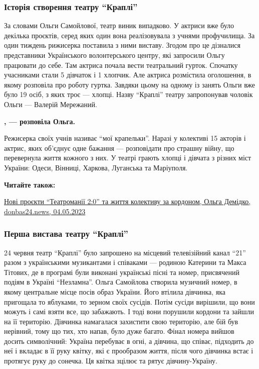 \subsubsection{Історія створення театру \enquote{Краплі}}

За словами Ольги Самойлової, театр виник випадково. У актриси вже було декілька
проєктів, серед яких один вона реалізовувала з учнями профучилища. За один
тиждень рижисерка поставила з ними виставу. Згодом про це дізналися
представники Українського волонтерського центру, які запросили Ольгу працювати
до себе. Там актриса почала вести театральний гурток. Спочатку учасниками стали
5 дівчаток і 1 хлопчик. Але актриса розмістила оголошення, в якому розповіла
про роботу гуртка. Завдяки цьому на одному із занять Ольги вже було 19 осіб, з
яких троє — хлопці. Назву \enquote{Краплі} театру запропонував чоловік Ольги —
Валерій Мережаний.

\begin{leftbar}
	\begingroup
		\bfseries
{}, — розповіла Ольга.
	\endgroup
\end{leftbar}

Режисерка своїх учнів називає \enquote{мої крапельки}. Наразі у колективі 15
акторів і актрис, яких об'єднує одне бажання — розповідати про страшну війну,
що перевернула життя кожного з них. У театрі грають хлопці і дівчата з різних
міст України: Одеси, Вінниці, Харкова, Луганська та Маріуполя. 

\textbf{Читайте також:} 

\href{https://donbas24.news/news/novi-projekti-teatromaniyi-20-ta-zittya-kolektivu-za-kordonom}{%
Нові проєкти \enquote{Театроманії 2:0} та життя колективу за кордоном, %
Ольга Демідко, donbas24.news, 04.05.2023}


\subsubsection{Перша вистава театру \enquote{Краплі}}

24 червня театр \enquote{Краплі} було запрошено на місцевий телевізійний канал \enquote{21}
разом з українськими музикантами і співаками — родиною Катерини та Макса
Тітових, де в програмі були виконані українські пісні та номер, присвячений
подіям в Україні \enquote{Незламна}. Ольга Самойлова створила музичний номер, в якому
центральне місце посів образ України. Його втілила дівчинка, яка пригощала то
яблуками, то зерном своїх сусідів. Потім сусіди вирішили, що вони можуть і самі
взяти все, що забажають. І тоді вони порушили кордони та зайшли на її
територію. Дівчинка намагалася захистити свою територію, але бій був нерівний,
тому що тих, хто напав, було дуже багато. Фінал номера вийшов досить
символічний: Україна перебуває в огні, а дівчина, що співає, підходить до неї і
вкладає в її руку квітку, які є прообразом життя, після чого дівчинка встає і
протягує руку до сонечка. Ця квітка зцілює та рятує дівчину-Україну.

